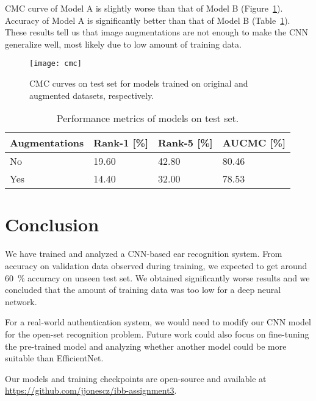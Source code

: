 \documentclass[9pt]{IEEEtran}
\begin{document}
CMC curve of Model A is slightly worse than that of Model B (Figure~\ref{fig:cmc}).
Accuracy of Model A is significantly better than that of Model B (Table~\ref{tab:metrics}).
These results tell us that image augmentations are not enough to make the CNN generalize well, most likely due to low amount of training data.

\begin{figure}[ht]
    \centering
    \texttt{[image: cmc]}
    \caption{CMC curves on test set for models trained on original and augmented datasets, respectively.}
    \label{fig:cmc}
\end{figure}

\begin{table}[ht]
    \caption{Performance metrics of models on test set.}
    \label{tab:metrics}
    \centering
    \begin{tabular}{llll}
        Augmentations & Rank-1 [\%] & Rank-5 [\%] & AUCMC [\%] \\
        \hline
        No & 19.60 & 42.80 & 80.46 \\
        Yes & 14.40 & 32.00 & 78.53
    \end{tabular}
\end{table}

\section{Conclusion}

We have trained and analyzed a CNN-based ear recognition system.
From accuracy on validation data observed during training, we expected to get around 60~\% accuracy on unseen test set.
We obtained significantly worse results and we concluded that the amount of training data was too low for a deep neural network.

For a real-world authentication system, we would need to modify our CNN model for the open-set recognition problem.
Future work could also focus on fine-tuning the pre-trained model and analyzing whether another model could be more suitable than EfficientNet.

Our models and training checkpoints are open-source and available at \url{https://github.com/jjonescz/ibb-assignment3}.



\end{document}
